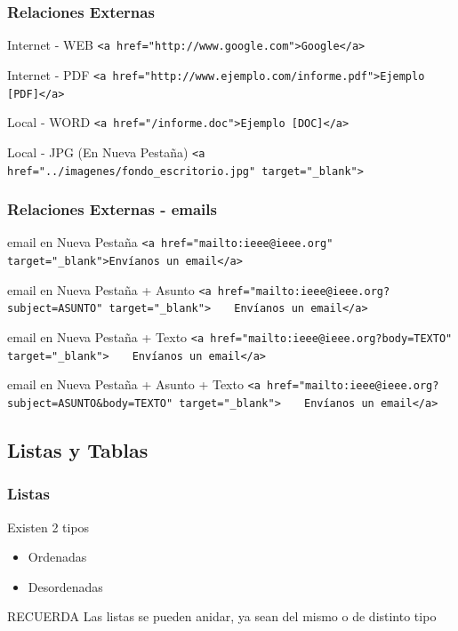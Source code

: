 \documentclass{beamer}
\begin{document}
\begin{frame}[fragile] %
\frametitle{Relaciones Externas}
	\begin{block}{Internet - WEB}
	\scriptsize{\verb|<a href="http://www.google.com">Google</a>|}
	\end{block}
	\begin{block}{Internet - PDF}
	\scriptsize{\verb|<a href="http://www.ejemplo.com/informe.pdf">Ejemplo [PDF]</a>|}
	\end{block}
	\begin{block}{Local - WORD}
	\scriptsize{\verb|<a href="/informe.doc">Ejemplo [DOC]</a>|}
	\end{block}
	\begin{block}{Local - JPG (En Nueva Pestaña)}
	\scriptsize{\verb|<a href="../imagenes/fondo_escritorio.jpg" target="_blank">|}
	\end{block}
\end{frame}

\begin{frame}[fragile] %
\frametitle{Relaciones Externas - emails}
	\begin{block}{email en Nueva Pestaña}
	\scriptsize{\verb|<a href="mailto:ieee@ieee.org" target="_blank">Envíanos un email</a>|}
	\end{block}
	\begin{block}{email en Nueva Pestaña + Asunto}
	\scriptsize{\verb|<a href="mailto:ieee@ieee.org?subject=ASUNTO" target="_blank">|
				\verb|   Envíanos un email</a>|}
	\end{block}
	\begin{block}{email en Nueva Pestaña + Texto}
	\scriptsize{\verb|<a href="mailto:ieee@ieee.org?body=TEXTO" target="_blank">|
				\verb|   Envíanos un email</a>|}
	\end{block}	
	\begin{block}{email en Nueva Pestaña + Asunto + Texto}
	\scriptsize{\verb|<a href="mailto:ieee@ieee.org?subject=ASUNTO&body=TEXTO" target="_blank">|
				\verb|   Envíanos un email</a>|}
	\end{block}
\end{frame}

	\subsection{Listas y Tablas}
\begin{frame}
\frametitle{Listas}
	Existen 2 tipos
	\begin{itemize}
	\item Ordenadas
	\item Desordenadas
	\end{itemize}
	\begin{exampleblock}{RECUERDA}
	Las listas se pueden anidar, ya sean del mismo o de distinto tipo
	\end{exampleblock}
\end{frame}
\end{document}
